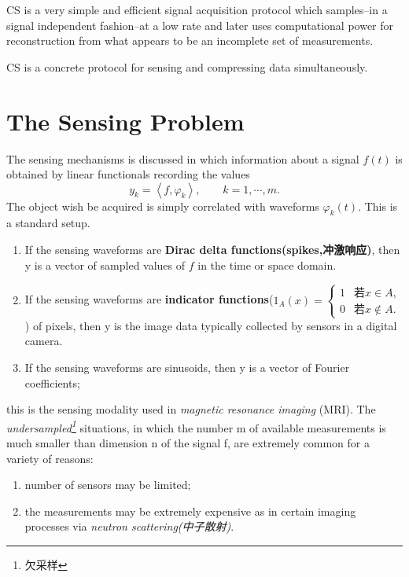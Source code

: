 CS is a very simple and efficient signal acquisition protocol which samples--\textcolor[rgb]{1,0,0}{in a signal independent fashion}--\textcolor[rgb]{1,0,0}{at a low rate and later uses computational power for reconstruction} from what appears to be an incomplete set of measurements.

CS is a concrete protocol for sensing and compressing data simultaneously.

\section{The Sensing Problem}
The sensing mechanisms is discussed in which information about a \textcolor[rgb]{1,0,0}{signal $f(t)$} is obtained by linear functionals recording the values
\begin{equation}
\label{eq1}
y_k=\left\langle f, \varphi_k \right\rangle,\qquad k=1,\cdots,m.
\end{equation}
The object wish be acquired is \textcolor[rgb]{1,0,0}{simply correlated with waveforms $\varphi_k(t)$}. This is a standard setup.
\begin{enumerate}
	\item If the \textcolor[rgb]{1,0,0}{sensing waveforms} are \textbf{Dirac delta functions(spikes,冲激响应)}, then y is a vector of sampled values of $f$ in the time or space domain.
	\item If the sensing waveforms are \textbf{indicator functions}($
		1_A(x)=\begin{cases}
		1 & \mbox{若$x\in A$},\\
		0 & \mbox{若$x\notin A$}.
		\end{cases}
	$) of pixels, then y is the	image data typically collected by sensors in a digital camera.
	\item If the sensing waveforms are sinusoids, then y is a vector of Fourier coefficients;
\end{enumerate}this is the sensing modality used in \emph{magnetic resonance imaging} (MRI).
The \emph{undersampled\footnote{欠采样}} situations, in which the number m of available measurements is much smaller than dimension n of the signal f, are extremely common for a variety of reasons:
\begin{enumerate}
	\item number of sensors may be limited;
	\item the measurements may be extremely expensive as in certain imaging processes via \emph{neutron scattering(中子散射)}.
\end{enumerate}

